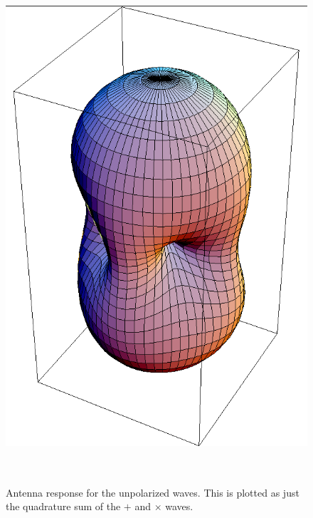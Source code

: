 \begin{figure}[!h]
\centerline{\includegraphics[angle=0,height=7.5in]{Figures/AppI/Peanut-unpol.png}}
\caption[Peanut (un-polarized)]{Antenna response for the unpolarized waves. 
         This is plotted as just the quadrature sum of the $+$ and $\times$ waves.}
\label{eq:Peanut-unpol}
\end{figure}







